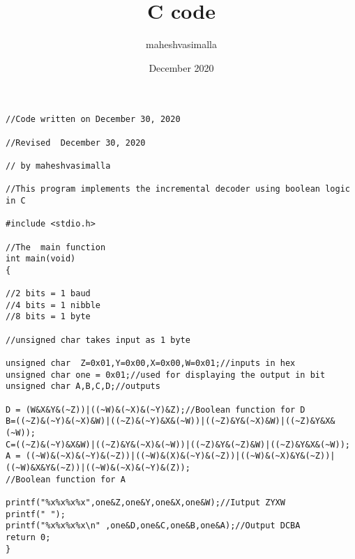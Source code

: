 \documentclass{article}
\title{C code}
\author{maheshvasimalla }
\date{December 2020}
\begin{document}
\maketitle

\begin{lstlisting}[style=CStyle]
//Code written on December 30, 2020

//Revised  December 30, 2020

// by maheshvasimalla

//This program implements the incremental decoder using boolean logic in C

#include <stdio.h>

//The  main function
int main(void)
{

//2 bits = 1 baud
//4 bits = 1 nibble
//8 bits = 1 byte

//unsigned char takes input as 1 byte

unsigned char  Z=0x01,Y=0x00,X=0x00,W=0x01;//inputs in hex	
unsigned char one = 0x01;//used for displaying the output in bit
unsigned char A,B,C,D;//outputs

D = (W&X&Y&(~Z))|((~W)&(~X)&(~Y)&Z);//Boolean function for D
B=((~Z)&(~Y)&(~X)&W)|((~Z)&(~Y)&X&(~W))|((~Z)&Y&(~X)&W)|((~Z)&Y&X&(~W));
C=((~Z)&(~Y)&X&W)|((~Z)&Y&(~X)&(~W))|((~Z)&Y&(~Z)&W)|((~Z)&Y&X&(~W));
A = ((~W)&(~X)&(~Y)&(~Z))|((~W)&(X)&(~Y)&(~Z))|((~W)&(~X)&Y&(~Z))|((~W)&X&Y&(~Z))|((~W)&(~X)&(~Y)&(Z));
//Boolean function for A

printf("%x%x%x%x",one&Z,one&Y,one&X,one&W);//Iutput ZYXW
printf(" ");
printf("%x%x%x%x\n" ,one&D,one&C,one&B,one&A);//Output DCBA
return 0;
}

\end{lstlisting}
\end{document}
